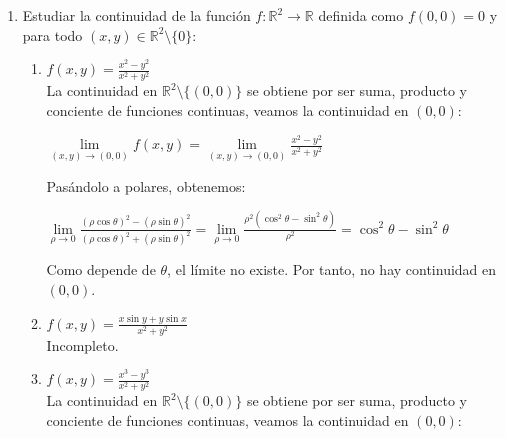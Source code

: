\documentclass[a4paper, 11pt]{article} %
\let\emptyset\varnothing
\begin{document}
\begin{enumerate}
\begin{proof}
		\begin{itemize}
			\item Si $\{x \in \mathbb{R}^N: f(x) > 0\} \cap A \neq \emptyset \Rightarrow \{x \in \mathbb{R}^N: f(x) < 0\} = \emptyset$ porque si no, $A = \{x \in \mathbb{R}^N: f(x) < 0\} \cup \{x \in \mathbb{R}^N: f(x) > 0\}$ lo cual contradice que $A$ sea conexo.
			\item Análogamente, se tiene que si $\{x \in \mathbb{R}^N: f(x) < 0\} \cap A \neq \emptyset \Rightarrow \{x \in \mathbb{R}^N: f(x) > 0\} = \emptyset$ porque si no, $A = \{x \in \mathbb{R}^N: f(x) > 0\} \cup \{x \in \mathbb{R}^N: f(x) < 0\}$ lo cual contradice que $A$ sea conexo.
		\end{itemize}
	\end{proof}
	\item Estudiar la continuidad de la función $f: \mathbb{R}^2 \rightarrow \mathbb{R}$ definida como $f(0,0) = 0$ y para todo $(x,y) \in \mathbb{R}^2 \setminus \{0\}$:
	\begin{enumerate}[label=\alph*)]
		\item $\displaystyle{f(x,y) = \frac{x^2-y^2}{x^2+y^2}}$\\
		La continuidad en $\mathbb{R}^2 \setminus \{(0,0)\}$ se obtiene por ser suma, producto y conciente de funciones continuas, veamos la continuidad en $(0,0)$:
		
		$\displaystyle{\lim\limits_{(x,y) \rightarrow (0,0)} f(x,y) = \lim\limits_{(x,y) \rightarrow (0,0)} \frac{x^2-y^2}{x^2+y^2}}$
		
		Pasándolo a polares, obtenemos:
		
		$\displaystyle{\lim\limits_{\rho \rightarrow 0} \frac{(\rho \cos \theta)^2-(\rho \sin \theta)^2}{(\rho \cos \theta)^2+(\rho \sin \theta)^2} = \lim\limits_{\rho \rightarrow 0} \frac{\rho^2 (\cos^2 \theta-\sin^2 \theta)}{\rho^2}} = \cos^2 \theta-\sin^2 \theta$
		
		Como depende de $\theta$, el límite no existe. Por tanto, no hay continuidad en $(0,0)$.
		\item $\displaystyle{f(x,y) = \frac{x\sin y+y\sin x}{x^2+y^2}}$\\
		Incompleto.%
		
		\item $\displaystyle{f(x,y) = \frac{x^3-y^3}{x^2+y^2}}$\\
		La continuidad en $\mathbb{R}^2 \setminus \{(0,0)\}$ se obtiene por ser suma, producto y conciente de funciones continuas, veamos la continuidad en $(0,0)$:
		

\end{enumerate}
\end{enumerate}
\end{document}

